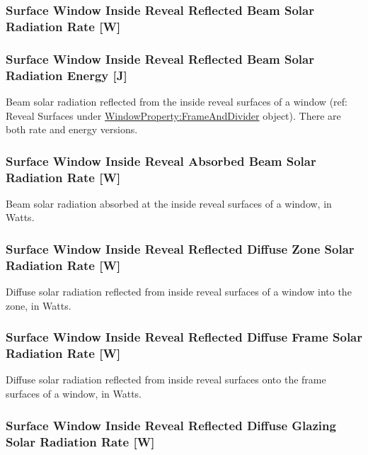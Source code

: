 \subsubsection{Surface Window Inside Reveal Reflected Beam Solar Radiation Rate {[}W{]}}\label{surface-window-inside-reveal-reflected-beam-solar-radiation-rate-w}

\subsubsection{Surface Window Inside Reveal Reflected Beam Solar Radiation Energy {[}J{]}}\label{surface-window-inside-reveal-reflected-beam-solar-radiation-energy-j}

Beam solar radiation reflected from the inside reveal surfaces of a window (ref: Reveal Surfaces under \hyperref[windowpropertyframeanddivider]{WindowProperty:FrameAndDivider} object). There are both rate and energy versions.

\subsubsection{Surface Window Inside Reveal Absorbed Beam Solar Radiation Rate {[}W{]}}\label{surface-window-inside-reveal-absorbed-beam-solar-radiation-rate-w}

Beam solar radiation absorbed at the inside reveal surfaces of a window, in Watts.

\subsubsection{Surface Window Inside Reveal Reflected Diffuse Zone Solar Radiation Rate {[}W{]}}\label{surface-window-inside-reveal-reflected-diffuse-zone-solar-radiation-rate-w}

Diffuse solar radiation reflected from inside reveal surfaces of a window into the zone, in Watts.

\subsubsection{Surface Window Inside Reveal Reflected Diffuse Frame Solar Radiation Rate {[}W{]}}\label{surface-window-inside-reveal-reflected-diffuse-frame-solar-radiation-rate-w}

Diffuse solar radiation reflected from inside reveal surfaces onto the frame surfaces of a window, in Watts.

\subsubsection{Surface Window Inside Reveal Reflected Diffuse Glazing Solar Radiation Rate {[}W{]}}\label{surface-window-inside-reveal-reflected-diffuse-glazing-solar-radiation-rate-w}

